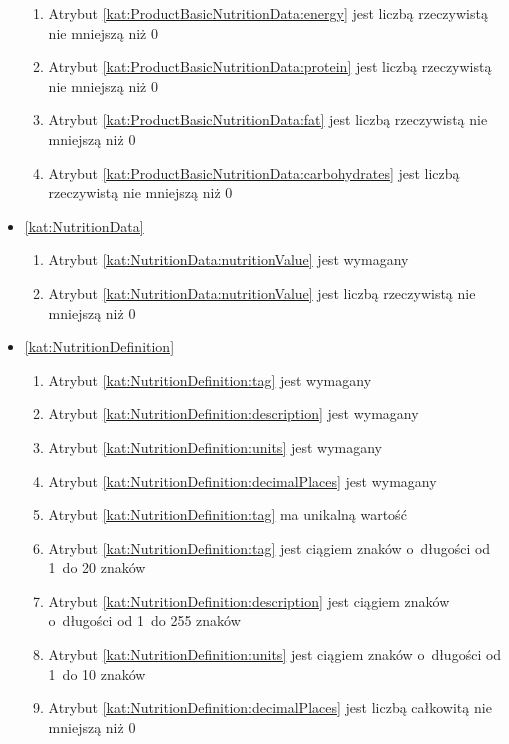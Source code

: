 \begin{itemize}[label={\textbf{Ograniczenia dla}}, wide, labelwidth=!, labelindent=0pt]
\begin{enumerate}[label={\textbf{OGR/2/\protect\twodigits{\arabic{enumi}}}}, wide, labelwidth=!, align=left, leftmargin=3cm, resume]
        \item Atrybut \ref{kat:ProductBasicNutritionData:energy} jest liczbą rzeczywistą nie mniejszą niż 0
        \item Atrybut \ref{kat:ProductBasicNutritionData:protein} jest liczbą rzeczywistą nie mniejszą niż 0
        \item Atrybut \ref{kat:ProductBasicNutritionData:fat} jest liczbą rzeczywistą nie mniejszą niż 0
        \item Atrybut \ref{kat:ProductBasicNutritionData:carbohydrates} jest liczbą rzeczywistą nie mniejszą niż 0
    \end{enumerate}

    \item\ref{kat:NutritionData}\mynobreakpar
    \begin{enumerate}[label={\textbf{OGR/2/\protect\twodigits{\arabic{enumi}}}}, wide, labelwidth=!, align=left, leftmargin=3cm, resume]
        \item Atrybut \ref{kat:NutritionData:nutritionValue} jest wymagany

        \item Atrybut \ref{kat:NutritionData:nutritionValue} jest liczbą rzeczywistą nie mniejszą niż 0
    \end{enumerate}

    \item\ref{kat:NutritionDefinition}\mynobreakpar
    \begin{enumerate}[label={\textbf{OGR/2/\protect\twodigits{\arabic{enumi}}}}, wide, labelwidth=!, align=left, leftmargin=3cm, resume]
        \item Atrybut \ref{kat:NutritionDefinition:tag} jest wymagany
        \item Atrybut \ref{kat:NutritionDefinition:description} jest wymagany
        \item Atrybut \ref{kat:NutritionDefinition:units} jest wymagany
        \item Atrybut \ref{kat:NutritionDefinition:decimalPlaces} jest wymagany

        \item Atrybut \ref{kat:NutritionDefinition:tag} ma unikalną wartość

        \item Atrybut \ref{kat:NutritionDefinition:tag} jest ciągiem znaków o~długości od 1~do 20 znaków
        \item Atrybut \ref{kat:NutritionDefinition:description} jest ciągiem znaków o~długości od 1~do 255 znaków
        \item Atrybut \ref{kat:NutritionDefinition:units} jest ciągiem znaków o~długości od 1~do 10 znaków
        \item Atrybut \ref{kat:NutritionDefinition:decimalPlaces} jest liczbą całkowitą nie mniejszą niż 0
    \end{enumerate}


\end{itemize}
